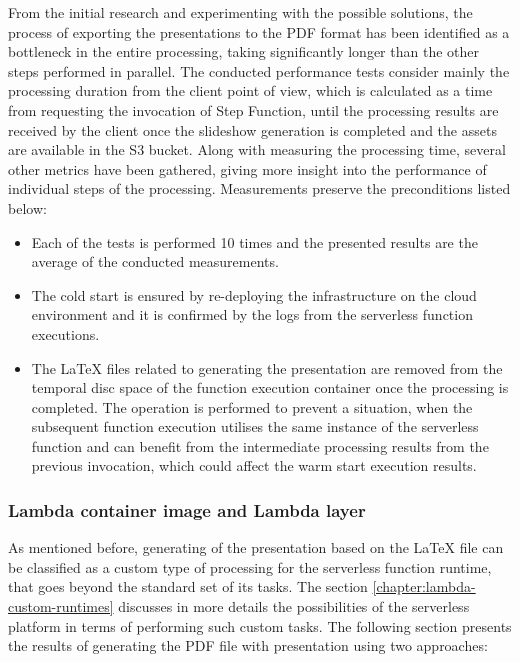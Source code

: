 From the initial research and experimenting with the possible solutions, the process of exporting the presentations to the PDF format has been identified as a bottleneck in the entire processing, taking significantly longer than the other steps performed in parallel.
The conducted performance tests consider mainly the processing duration from the client point of view, which is calculated as a time from requesting the invocation of Step Function, until the processing results are received by the client once the slideshow generation is completed and the assets are available in the S3 bucket.
Along with measuring the processing time, several other metrics have been gathered, giving more insight into the performance of individual steps of the processing.
Measurements preserve the preconditions listed below:

\begin{itemize}
   \item Each of the tests is performed 10 times and the presented results are the average of the conducted measurements.
   \item The cold start is ensured by re-deploying the infrastructure on the cloud environment and it is confirmed by the logs from the serverless function executions.
   \item The LaTeX files related to generating the presentation are removed from the temporal disc space of the function execution container once the processing is completed.
   The operation is performed to prevent a situation, when the subsequent function execution utilises the same instance of the serverless function and can benefit from the intermediate processing results from the previous invocation, which could affect the warm start execution results.
\end{itemize}

\subsubsection{Lambda container image and Lambda layer}

As mentioned before, generating of the presentation based on the LaTeX file can be classified as a custom type of processing for the serverless function runtime, that goes beyond the standard set of its tasks. The section \ref{chapter:lambda-custom-runtimes} discusses in more details the possibilities of the serverless platform in terms of performing such custom tasks. The following section presents the results of generating the PDF file with presentation using two approaches:

